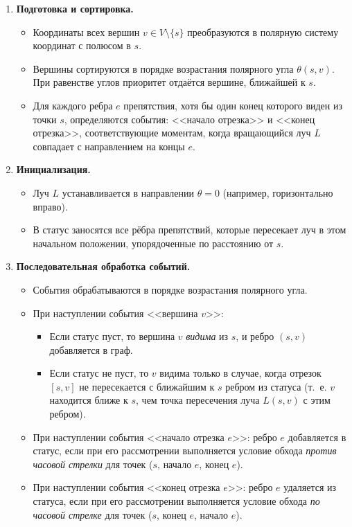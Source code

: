 \documentclass[intlimits,twoside,a4paper,11pt]{article}
\theoremstyle{definition}
\begin{document}
\begin{enumerate}
    \item[\textbf{Этап 1.}] \textbf{Подготовка и сортировка.}
    \begin{itemize}
        \item Координаты всех вершин $v \in V \setminus \{s\}$ преобразуются в полярную систему координат с полюсом в $s$.
        \item Вершины сортируются в порядке возрастания полярного угла $\theta(s, v)$. При равенстве углов приоритет отдаётся вершине, ближайшей к $s$.
        \item Для каждого ребра $e$ препятствия, хотя бы один конец которого виден из точки $s$, определяются события: 
            <<начало отрезка>> и <<конец отрезка>>, соответствующие моментам, когда вращающийся луч $L$ совпадает с направлением на концы $e$.
    \end{itemize}

    \item[\textbf{Этап 2.}] \textbf{Инициализация.}
    \begin{itemize}
        \item Луч $L$ устанавливается в направлении $\theta = 0$ (например, горизонтально вправо).
        \item В статус заносятся все рёбра препятствий, которые пересекает луч в этом начальном положении, упорядоченные по расстоянию от $s$.
    \end{itemize}

    \item[\textbf{Этап 3.}]\textbf{Последовательная обработка событий.}
    \begin{itemize}
        \item События обрабатываются в порядке возрастания полярного угла.
        \item При наступлении события <<вершина $v$>>:
        \begin{itemize}
            \item Если статус пуст, то вершина $v$ \emph{видима} из $s$, и ребро $(s, v)$ добавляется в граф.
            \item Если статус не пуст, то $v$ видима только в случае, когда отрезок $[s, v]$ не пересекается с ближайшим к $s$ ребром из статуса
                (т.~е. $v$ находится ближе к $s$, чем точка пересечения луча $L(s, v)$ с этим ребром).
        \end{itemize}
        \item При наступлении события <<начало отрезка $e$>>: ребро $e$ добавляется в статус,
            если при его рассмотрении выполняется условие обхода \emph{против часовой стрелки} для точек ($s$, начало $e$, конец $e$).
        \item При наступлении события <<конец отрезка $e$>>: ребро $e$ удаляется из статуса,
            если при его рассмотрении выполняется условие обхода \emph{по часовой стрелке} для точек ($s$, конец $e$, начало $e$).
    \end{itemize}
\end{enumerate}
\end{document}
